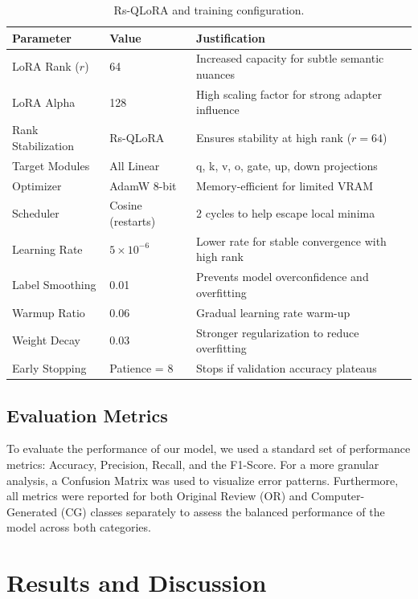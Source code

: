 \documentclass[utf8]{FrontiersinHarvard}
\begin{document}
\begin{table}[htbp]
\caption{Rs-QLoRA and training configuration.}\label{tab:config}
\centering
\begin{tabular}{lll}
\toprule
\textbf{Parameter} & \textbf{Value} & \textbf{Justification} \\
\midrule
LoRA Rank ($r$) & 64 & Increased capacity for subtle semantic nuances \\
LoRA Alpha & 128 & High scaling factor for strong adapter influence \\
Rank Stabilization & Rs-QLoRA & Ensures stability at high rank ($r=64$) \\
Target Modules & All Linear & q, k, v, o, gate, up, down projections \\
Optimizer & AdamW 8-bit & Memory-efficient for limited VRAM \\
Scheduler & Cosine (restarts) & 2 cycles to help escape local minima \\
Learning Rate & $5 \times 10^{-6}$ & Lower rate for stable convergence with high rank \\
Label Smoothing & 0.01 & Prevents model overconfidence and overfitting \\
Warmup Ratio & 0.06 & Gradual learning rate warm-up \\
Weight Decay & 0.03 & Stronger regularization to reduce overfitting \\
Early Stopping & Patience = 8 & Stops if validation accuracy plateaus \\
\bottomrule
\end{tabular}
\end{table}

\subsection{Evaluation Metrics}

To evaluate the performance of our model, we used a standard set of performance metrics: Accuracy, Precision, Recall, and the F1-Score. For a more granular analysis, a Confusion Matrix was used to visualize error patterns. Furthermore, all metrics were reported for both Original Review (OR) and Computer-Generated (CG) classes separately to assess the balanced performance of the model across both categories.



\section{Results and Discussion}
\end{document}
